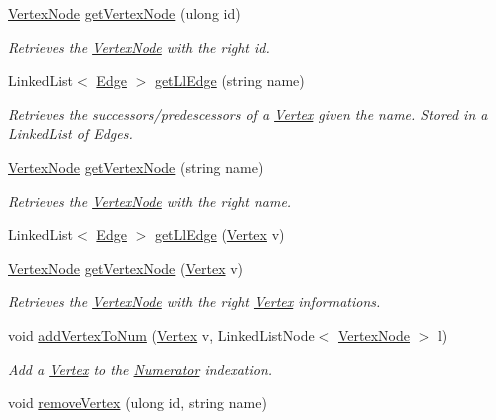 \begin{DoxyCompactItemize}
\hyperlink{classVertexNode}{Vertex\+Node} \hyperlink{classNumerator_ae9abf16e1eb7b23aa494e5549295c2da}{get\+Vertex\+Node} (ulong id)
\begin{DoxyCompactList}\small\item\em Retrieves the \hyperlink{classVertexNode}{Vertex\+Node} with the right id. \end{DoxyCompactList}\item 
Linked\+List$<$ \hyperlink{classEdge}{Edge} $>$ \hyperlink{classNumerator_aa604099f90d52d4add368caff4313707}{get\+Ll\+Edge} (string name)
\begin{DoxyCompactList}\small\item\em Retrieves the successors/predescessors of a \hyperlink{structVertex}{Vertex} given the name. Stored in a Linked\+List of Edges. \end{DoxyCompactList}\item 
\hyperlink{classVertexNode}{Vertex\+Node} \hyperlink{classNumerator_a1b4e078d6a0b4ae14b48f747cd9394a2}{get\+Vertex\+Node} (string name)
\begin{DoxyCompactList}\small\item\em Retrieves the \hyperlink{classVertexNode}{Vertex\+Node} with the right name. \end{DoxyCompactList}\item 
Linked\+List$<$ \hyperlink{classEdge}{Edge} $>$ \hyperlink{classNumerator_ac2697483375a76133c5e8177ab228fb8}{get\+Ll\+Edge} (\hyperlink{structVertex}{Vertex} v)
\item 
\hyperlink{classVertexNode}{Vertex\+Node} \hyperlink{classNumerator_af1261c09ecf6d1bee5f2da73fb89507d}{get\+Vertex\+Node} (\hyperlink{structVertex}{Vertex} v)
\begin{DoxyCompactList}\small\item\em Retrieves the \hyperlink{classVertexNode}{Vertex\+Node} with the right \hyperlink{structVertex}{Vertex} informations. \end{DoxyCompactList}\item 
void \hyperlink{classNumerator_a2c11a54c2054c561562cde0f18fac1a0}{add\+Vertex\+To\+Num} (\hyperlink{structVertex}{Vertex} v, Linked\+List\+Node$<$ \hyperlink{classVertexNode}{Vertex\+Node} $>$ l)
\begin{DoxyCompactList}\small\item\em Add a \hyperlink{structVertex}{Vertex} to the \hyperlink{classNumerator}{Numerator} indexation. \end{DoxyCompactList}\item 
void \hyperlink{classNumerator_a76233f0c954ed3987b4c1877c2555a15}{remove\+Vertex} (ulong id, string name)

\end{DoxyCompactItemize}
